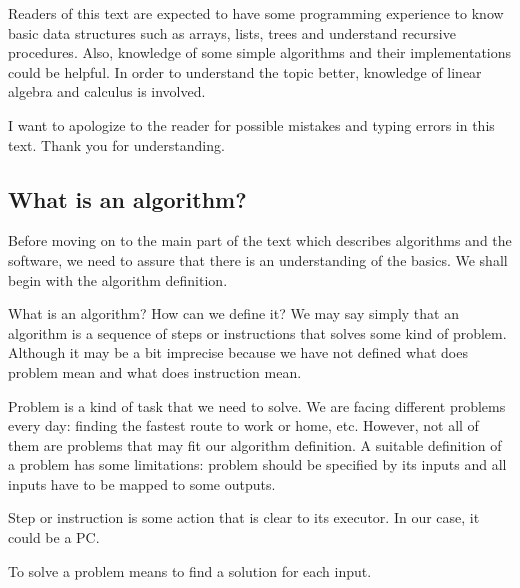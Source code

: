 \documentclass[
  field=inf,
  biblatex,
  language=english,
  glossaries,
  theorems=false,
  index
]{kidiplom}
\begin{document}
Readers of this text are expected to have some programming experience to know basic data structures such as arrays, lists, trees and understand recursive procedures. Also, knowledge of some simple algorithms and their implementations could be helpful. In order to understand the topic better, knowledge of linear algebra and calculus is involved.

I want to apologize to the reader for possible mistakes and typing errors in this text. Thank you for understanding.

\newpage
\subsection{What is an algorithm?}

Before moving on to the main part of the text which describes algorithms and the software, we need to assure that there is an understanding of the basics. We shall begin with the algorithm definition.

What is an algorithm? How can we define it? We may say simply that an algorithm is a sequence of steps or instructions that solves some kind of problem. Although it may be a bit imprecise because we have not defined what does problem mean and what does instruction mean.

Problem is a kind of task that we need to solve. We are facing different problems every day: finding the fastest route to work or home, etc. However, not all of them are problems that may fit our algorithm definition. A suitable definition of a problem has some limitations: problem should be specified by its inputs and all inputs have to be mapped to some outputs.

Step or instruction is some action that is clear to its executor. In our case, it could be a PC.

To solve a problem means to find a solution for each input.
\end{document}
